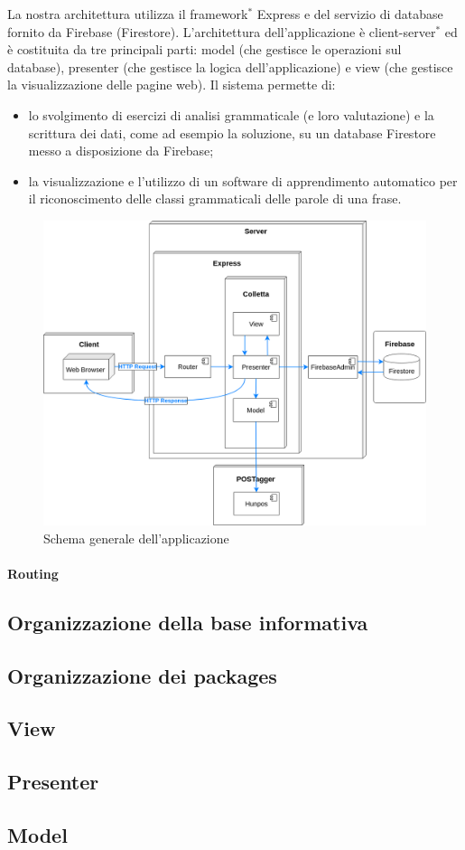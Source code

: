 La nostra architettura utilizza il framework$^{*}$ Express e del servizio di database fornito da Firebase (Firestore). L'architettura dell'applicazione è client-server$^{*}$ ed è costituita da tre principali parti: model (che gestisce le operazioni sul database), presenter (che gestisce la logica dell'applicazione) e view (che gestisce la visualizzazione delle pagine web). Il sistema permette di:
\begin{itemize}
	\item lo svolgimento di esercizi di analisi grammaticale (e loro valutazione) e la scrittura dei dati, come ad esempio la soluzione, su un database Firestore messo a disposizione da Firebase;
	\item la visualizzazione e l'utilizzo di un software di apprendimento automatico per il riconoscimento delle classi grammaticali delle parole di una frase.
\end{itemize}

\begin{figure}[h]
	\includegraphics[scale=0.4]{images/architettura.png}
	\caption{Schema generale dell'applicazione}
\end{figure}

\paragraph*{Routing\\}

\newpage

\subsection{Organizzazione della base informativa}

\newpage

\subsection{Organizzazione dei packages}

\newpage

\subsection{View}

\newpage
\subsection{Presenter}

\newpage
\subsection{Model}

\newpage